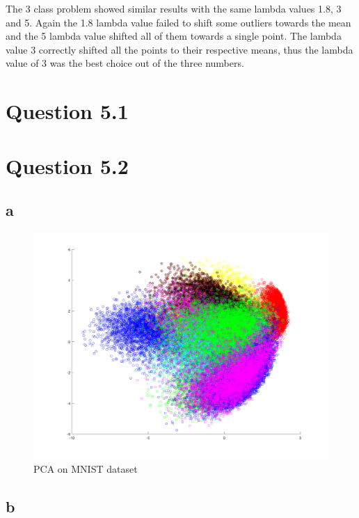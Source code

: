 The 3 class problem showed similar results with the same lambda values 1.8, 3 and 5.
Again the 1.8 lambda value failed to shift some outliers towards the mean and the 5 lambda value shifted all of them towards a single point.
The lambda value 3 correctly shifted all the points to their respective means, thus the lambda value of 3 was the best choice out of the three numbers.

\newpage
\section*{Question 5.1}



\section*{Question 5.2}

\subsection*{a}

\begin{figure}[H]
    \includegraphics[width=\linewidth]{../../pracs/week6/images/q2_pca}
    \centering
    \caption{PCA on MNIST dataset}
\end{figure}

\subsection*{b}


